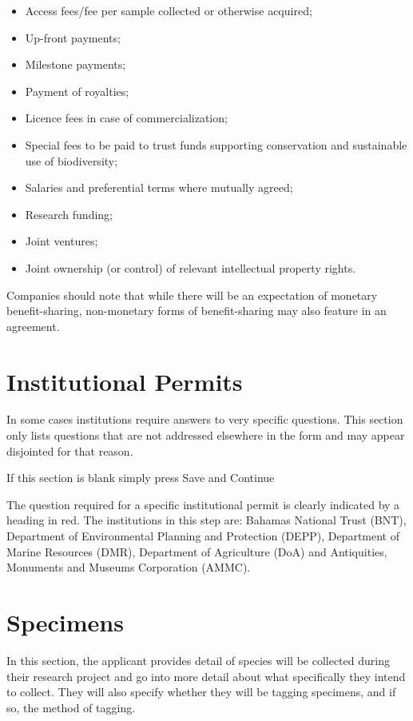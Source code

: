 \documentclass[
]{book}
\providecommand{\tightlist}{%
  \setlength{\itemsep}{0pt}\setlength{\parskip}{0pt}}
\begin{document}
\begin{itemize}
\tightlist
\item
  Access fees/fee per sample collected or otherwise acquired;
\item
  Up-front payments;
\item
  Milestone payments;
\item
  Payment of royalties;
\item
  Licence fees in case of commercialization;
\item
  Special fees to be paid to trust funds supporting conservation and sustainable use of biodiversity;
\item
  Salaries and preferential terms where mutually agreed;
\item
  Research funding;
\item
  Joint ventures;
\item
  Joint ownership (or control) of relevant intellectual property rights.
\end{itemize}

Companies should note that while there will be an expectation of monetary benefit-sharing, non-monetary forms of benefit-sharing may also feature in an agreement.

\hypertarget{institutional-permits}{%
\chapter{Institutional Permits}\label{institutional-permits}}

In some cases institutions require answers to very specific questions. This section only lists questions that are not addressed elsewhere in the form and may appear disjointed for that reason.

If this section is blank simply press Save and Continue

The question required for a specific institutional permit is clearly indicated by a heading in red. The institutions in this step are: Bahamas National Trust (BNT), Department of Environmental Planning and Protection (DEPP), Department of Marine Resources (DMR), Department of Agriculture (DoA) and Antiquities, Monuments and Museums Corporation (AMMC).

\hypertarget{specimens}{%
\chapter{Specimens}\label{specimens}}

In this section, the applicant provides detail of species will be collected during their research project and go into more detail about what specifically they intend to collect. They will also specify whether they will be tagging specimens, and if so, the method of tagging.
\end{document}
